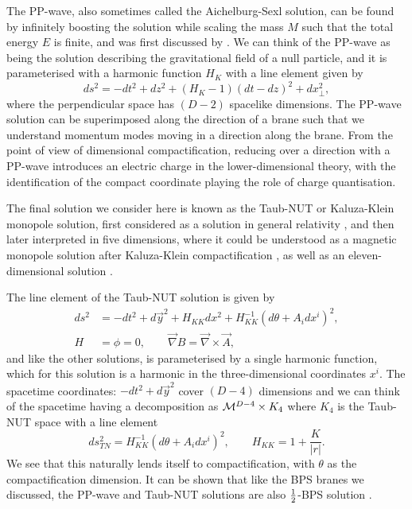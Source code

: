 The PP-wave, also sometimes called the Aichelburg-Sexl \cite{Aichelburg:1970dh} solution, can be found by infinitely boosting the \sch solution while scaling the mass $M$ such that the total energy $E$ is finite, and was first discussed by \cite{Brinkmann1925}. We can think of the PP-wave as being the solution describing the gravitational field of a null particle, and it is parameterised with a harmonic function $H_K$ with a line element given by
\begin{equation*}
ds^2 =	-dt^2 + dz^2 + (H_K - 1) (dt - dz)^2 + dx^2_{\perp},
\end{equation*}
where the perpendicular space has $(D-2)$ spacelike dimensions. The PP-wave solution can be superimposed along the direction of a brane such that we understand momentum modes moving in a direction along the brane. From the point of view of dimensional compactification, reducing over a direction with a PP-wave introduces an electric charge in the lower-dimensional theory, with the identification of the compact coordinate playing the role of charge quantisation.

The final solution we consider here is known as the Taub-NUT or Kaluza-Klein monopole solution, first considered as a solution in general relativity \cite{Taub:1951, osti:1963}, and then later interpreted in five dimensions, where it could be understood as a magnetic monopole solution after Kaluza-Klein compactification \cite{Sorkin:1987}, as well as an eleven-dimensional solution \cite{Han:1984ze}.

The line element of the Taub-NUT solution is given by
\begin{equation*}
\begin{aligned}
ds^2 &= -dt^2 + d\vec{y}^2 + H_{KK} dx^2  +H_{KK}^{-1} \left(d\theta + A_i dx^i \right)^2, \\
	H &= \phi = 0, \qquad \vec{\nabla} B = \vec{\nabla} \times \vec{A},
\end{aligned}	
\end{equation*}
and like the other solutions, is parameterised by a single harmonic function, which for this solution is a harmonic in the three-dimensional coordinates $x^i$. The spacetime coordinates: $-dt^2 + d\vec{y}^2$ cover $(D-4)$ dimensions and we can think of the spacetime having a decomposition as ${\cal M}^{D-4} \times K_4$ where $K_4$ is the Taub-NUT space with a line element
\begin{equation*}
	ds^2_{TN} = H_{KK}^{-1} \left(d\theta + A_i dx^i \right)^2, \qquad H_{KK} = 1 + \frac{K}{|r|}	.
\end{equation*}
We see that this naturally lends itself to compactification, with $\theta$ as the compactification dimension. It can be shown that like the BPS branes we discussed, the PP-wave and Taub-NUT solutions are also $\frac{1}{2}$-BPS solution \cite{Stelle:1998xg}.

